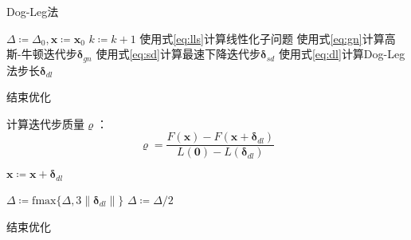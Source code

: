\begin{algorithm}[htb!]
\caption{Dog-Leg法}
\begin{algorithmic}
    \State $\Delta \coloneqq \Delta_0, \bm{x} \coloneqq \bm{x}_0$
        \State $k \coloneqq k+1$
        \State 使用式\eqref{eq:lls}计算线性化子问题
        \State 使用式\eqref{eq:gn}计算高斯-牛顿迭代步$\bm{\delta}_{gn}$
        \State 使用式\eqref{eq:sd}计算最速下降迭代步$\bm{\delta}_{sd}$
        \State 使用式\eqref{eq:dl}计算Dog-Leg法步长$\bm{\delta}_{dl}$

            \State 结束优化
        \EndIf

        \State 计算迭代步质量$\varrho$：
        \[
            \varrho = \frac {F(\bm{x})-F(\bm{x}+\bm{\delta}_{dl})}
                            {L(\bm{0})-L(\bm{\delta}_{dl})}
        \]

            \State $\bm{x} \coloneqq \bm{x} + \bm{\delta}_{dl}$
        \EndIf

            \State $\Delta \coloneqq \text{fmax}\{\Delta,3\left\|\bm{\delta}_{dl}\right\|\}$
            \State $\Delta \coloneqq \Delta/2$
        \EndIf

            \State 结束优化
        \EndIf
    \EndFor
\end{algorithmic}
\label{alg:dogleg}
\end{algorithm}
